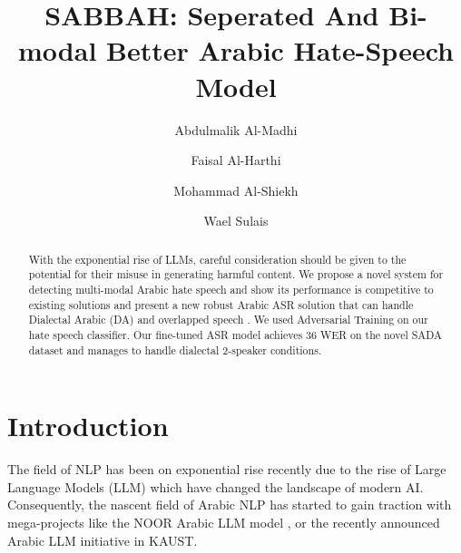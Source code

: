 \documentclass[10pt,twocolumn,letterpaper]{article}
\def\confName{KAUST}
\begin{document}
\title{SABBAH: Seperated And Bi-modal Better Arabic Hate-Speech Model}


\author{Abdulmalik Al-Madhi}
\author{Faisal Al-Harthi}
\author{Mohammad Al-Shiekh}
\author{Wael Sulais}

\maketitle



\begin{abstract}
    
With the exponential rise of LLMs, careful consideration should be given to the potential for their misuse in generating harmful content.
We propose a novel system for detecting multi-modal Arabic hate speech and show its performance is competitive to existing solutions and present a new robust Arabic ASR solution that can handle Dialectal Arabic (DA) and overlapped speech
.
We used Adversarial Training on our hate speech classifier.
Our fine-tuned ASR model achieves 36 WER on the novel SADA dataset and manages to handle dialectal 2-speaker conditions.
\end{abstract}

\section{Introduction}
\label{sec:intro}

The field of NLP has been on exponential rise recently due to the rise of Large Language Models (LLM) which have changed the landscape of modern AI.
Consequently, the nascent field of Arabic NLP has started to gain traction with mega-projects like the NOOR Arabic LLM model \cite{lakimHolisticAssessmentCarbon2022}, or the recently announced Arabic LLM initiative in KAUST.
\end{document}
